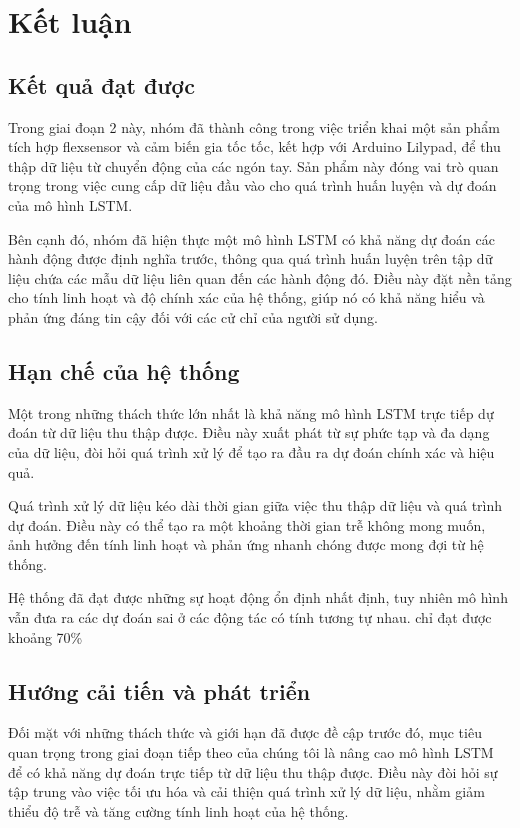 \section{Kết luận}
\subsection{Kết quả đạt được}

\indent Trong giai đoạn 2 này, nhóm đã thành công trong việc triển khai một sản phẩm tích hợp flexsensor và cảm biến gia tốc tốc, kết hợp với Arduino Lilypad, để thu thập dữ liệu từ chuyển động của các ngón tay. Sản phẩm này đóng vai trò quan trọng trong việc cung cấp dữ liệu đầu vào cho quá trình huấn luyện và dự đoán của mô hình LSTM.

\indent Bên cạnh đó, nhóm đã hiện thực một mô hình LSTM có khả năng dự đoán các hành động được định nghĩa trước, thông qua quá trình huấn luyện trên tập dữ liệu chứa các mẫu dữ liệu liên quan đến các hành động đó. Điều này đặt nền tảng cho tính linh hoạt và độ chính xác của hệ thống, giúp nó có khả năng hiểu và phản ứng đáng tin cậy đối với các cử chỉ của người sử dụng.

\subsection{Hạn chế của hệ thống}
\indent Một trong những thách thức lớn nhất là khả năng mô hình LSTM trực tiếp dự đoán từ dữ liệu thu thập được. Điều này xuất phát từ sự phức tạp và đa dạng của dữ liệu, đòi hỏi quá trình xử lý để tạo ra đầu ra dự đoán chính xác và hiệu quả.

\indent Quá trình xử lý dữ liệu kéo dài thời gian giữa việc thu thập dữ liệu và quá trình dự đoán. Điều này có thể tạo ra một khoảng thời gian trễ không mong muốn, ảnh hưởng đến tính linh hoạt và phản ứng nhanh chóng được mong đợi từ hệ thống.

\indent Hệ thống đã đạt được những sự hoạt động ổn định nhất định, tuy nhiên mô hình vẫn đưa ra các dự đoán sai ở các động tác có tính tương tự nhau. chỉ đạt được khoảng 70\%
\subsection{Hướng cải tiến và phát triển}
\indent Đối mặt với những thách thức và giới hạn đã được đề cập trước đó, mục tiêu quan trọng trong giai đoạn tiếp theo của chúng tôi là nâng cao mô hình LSTM để có khả năng dự đoán trực tiếp từ dữ liệu thu thập được. Điều này đòi hỏi sự tập trung vào việc tối ưu hóa và cải thiện quá trình xử lý dữ liệu, nhằm giảm thiểu độ trễ và tăng cường tính linh hoạt của hệ thống.